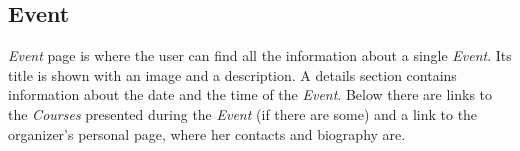 \documentclass[../../DD.tex]{subfiles}
\begin{document}
	\newpage
	\subsection{Event}
		\textit{Event} page is where the user can find all the information about a single \textit{Event}. Its title is shown with an image and a description. A details section contains information about the date and the time of the \textit{Event}. Below there are links to the \textit{Courses} presented during the \textit{Event} (if there are some) and a link to the organizer's personal page, where her contacts and biography are.
		\newline
\end{document}
